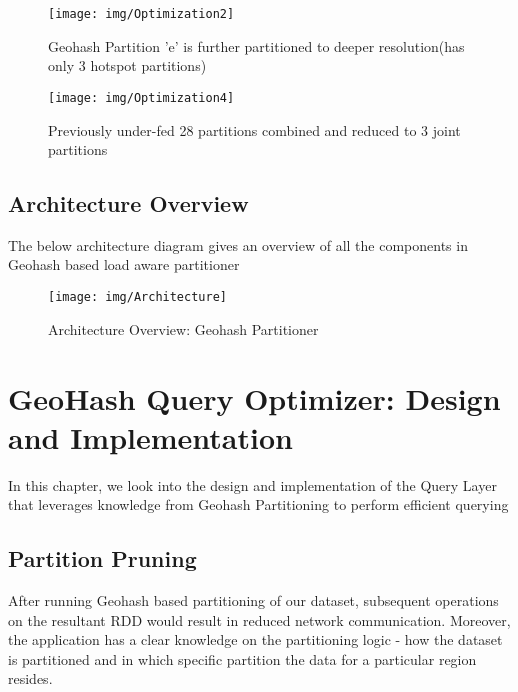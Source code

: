 \documentclass[article,type=msc,colorback,12pt,accentcolor=tud1d]{tudthesis}
\begin{document}
			\clearpage	
						
			\begin{figure}[p]
			\centering
			\texttt{[image: img/Optimization2]}
			\caption{Geohash Partition 'e' is further partitioned to deeper resolution(has only 3 hotspot partitions)}
			\label{fig:Optimization2}
			\end{figure}
						
						
			\begin{figure}[p]
			\centering
			\texttt{[image: img/Optimization4]}
			\caption{Previously under-fed 28 partitions combined and reduced to 3 joint partitions}
			\label{fig:Optimization4}
			\end{figure}
			
			\clearpage
			\subsection{Architecture Overview}
				\par The below architecture diagram gives an overview of all the components in Geohash based load aware partitioner \\
				\begin{figure}[h]
					\centering
					\texttt{[image: img/Architecture]}
					\caption{Architecture Overview: Geohash Partitioner}
					\label{fig:Architecture}
				\end{figure}
				
			
			
	  \cleardoublepage
	\hfill
	\section{GeoHash Query Optimizer: Design and Implementation}
	\hfill
	
		\par In this chapter, we look into the design and implementation of the Query Layer that leverages knowledge from Geohash Partitioning to perform efficient querying 
		\subsection{Partition Pruning}
			\par After running Geohash based partitioning of our dataset, subsequent operations on the resultant RDD would result in reduced network communication. Moreover, the application has a clear knowledge on the partitioning logic - how the dataset is partitioned and in which specific partition the data for a particular region resides.
			
\end{document}
